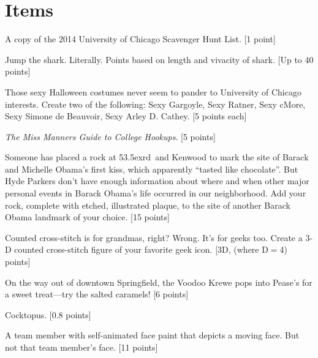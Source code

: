 \documentclass{book}
\def\rd{\raise.5ex\hbox{\scriptsize rd}}
\begin{document}
\newpage
\section*{Items}
\pagestyle{plain}
 \setcounter{page}{1}
\begin{list}{}{}



\item A copy of the 2014 University of Chicago Scavenger Hunt List. [1 point] 

\item Jump the shark. Literally. Points based on length and vivacity of shark. [Up to 40 points]

\item Those sexy Halloween costumes never seem to pander to University of Chicago interests. Create two of the following: Sexy Gargoyle, Sexy Ratner, Sexy cMore, Sexy Simone de Beauvoir, Sexy Arley D. Cathey. [5 points each]

\item \emph{The Miss Manners Guide to College Hookups}. [5 points]

\item Someone has placed a rock at 53\rd\ and Kenwood to mark the site of Barack and Michelle Obama's first kiss, which apparently ``tasted like chocolate''. But Hyde Parkers don't have  enough information about where and when other major personal events in Barack Obama's life occurred in our  neighborhood. Add your rock, complete with etched, illustrated plaque, to the site of another Barack Obama landmark of your choice. [15 points]

\item Counted cross-stitch is for grandmas, right? Wrong. It's for geeks too. Create a 3-D counted cross-stitch figure of your favorite geek icon. [3D, (where D$=$4) points]

\item On the way out of downtown Springfield, the Voodoo Krewe pops into Pease's for a sweet treat---try the salted caramels!  [6 points]

\item Cocktopus. [0.8 points]

\item A team member with self-animated face paint that depicts a moving face. But not that team member's face.  [11 points]


\end{list}
\end{document}
